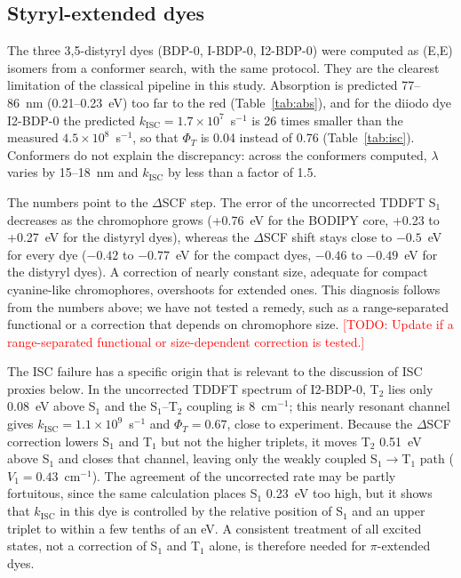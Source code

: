 \documentclass[journal=jpcafh,manuscript=article]{achemso}
\newcommand{\todo}[1]{\textcolor{red}{[TODO: #1]}}
\newcommand{\kisc}{k_\mathrm{ISC}}
\begin{document}
\subsection{Styryl-extended dyes}
\label{sec:styryl}

The three 3,5-distyryl dyes (BDP-0, I-BDP-0, I2-BDP-0) were computed as (E,E) isomers from a
conformer search, with the same protocol. They are the clearest limitation of the classical
pipeline in this study. Absorption is predicted 77--86~nm (0.21--0.23~eV) too far to the red
(Table~\ref{tab:abs}), and for the diiodo dye I2-BDP-0 the predicted
$\kisc=1.7\times10^{7}$~s$^{-1}$ is 26 times smaller than the measured $4.5\times10^{8}$~s$^{-1}$, so
that $\Phi_T$ is 0.04 instead of 0.76 (Table~\ref{tab:isc}). Conformers do not explain the
discrepancy: across the conformers computed, $\lambda$ varies by 15--18~nm and $\kisc$ by less than a
factor of 1.5.

The numbers point to the $\Delta$SCF step. The error of the uncorrected TDDFT S$_1$ decreases as the
chromophore grows (+0.76~eV for the BODIPY core, +0.23 to +0.27~eV for the distyryl dyes), whereas the
$\Delta$SCF shift stays close to $-0.5$~eV for every dye ($-0.42$ to $-0.77$~eV for the compact dyes,
$-0.46$ to $-0.49$~eV for the distyryl dyes). A correction of nearly constant size, adequate for
compact cyanine-like chromophores, overshoots for extended ones. This diagnosis follows from the
numbers above; we have not tested a remedy, such as a range-separated functional or a correction
that depends on chromophore size. \todo{Update if a range-separated functional or size-dependent
correction is tested.}

The ISC failure has a specific origin that is relevant to the discussion of ISC proxies below. In
the uncorrected TDDFT spectrum of I2-BDP-0, T$_2$ lies only 0.08~eV above S$_1$ and the S$_1$--T$_2$
coupling is 8~cm$^{-1}$; this nearly resonant channel gives $\kisc=1.1\times10^{9}$~s$^{-1}$ and
$\Phi_T=0.67$, close to experiment. Because the $\Delta$SCF correction lowers S$_1$ and T$_1$ but not
the higher triplets, it moves T$_2$ 0.51~eV above S$_1$ and closes that channel, leaving only the
weakly coupled S$_1\to$T$_1$ path ($V_1=0.43$~cm$^{-1}$). The agreement of the uncorrected rate may be
partly fortuitous, since the same calculation places S$_1$ 0.23~eV too high, but it shows that
$\kisc$ in this dye is controlled by the relative position of S$_1$ and an upper triplet to within a
few tenths of an eV. A consistent treatment of all excited states, not a correction of S$_1$ and
T$_1$ alone, is therefore needed for $\pi$-extended dyes.
\end{document}
